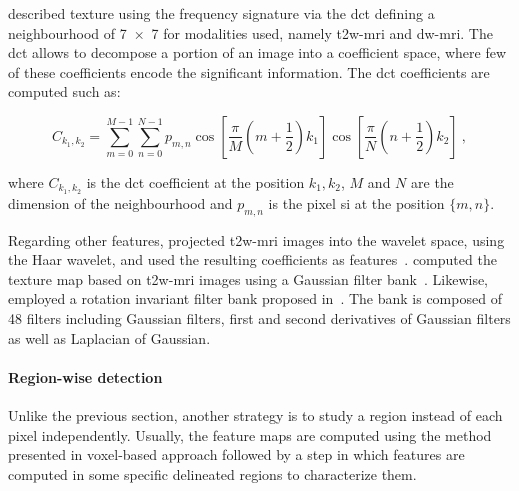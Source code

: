 \citeauthor{Chan2003} described texture using the frequency signature via the \acf{dct}\cite{Ahmed1974} defining a neighbourhood of \SI[product-units=repeat]{7x7}{\px} for modalities used, namely \ac{t2w}-\ac{mri} and \ac{dw}-\ac{mri}.
The \ac{dct} allows to decompose a portion of an image into a coefficient space, where few of these coefficients encode the significant information.
The \ac{dct} coefficients are computed such as:

\begin{equation}
	C_{k_1,k_2} = \sum_{m=0}^{M-1} \sum_{n=0}^{N-1} p_{m,n} \cos \left[ \frac{\pi}{M} \left( m + \frac{1}{2} \right) k_1 \right] \cos \left[ \frac{\pi}{N} \left( n + \frac{1}{2} \right) k_2 \right] \ ,
\end{equation}

\noindent where $C_{k_1,k_2}$ is the \ac{dct} coefficient at the position $k_1,k_2$, $M$ and $N$ are the dimension of the neighbourhood and $p_{m,n}$ is the pixel \ac{si} at the position $\{m,n\}$.

Regarding other features, \citeauthor{Viswanath2012} projected \ac{t2w}-\ac{mri} images into the wavelet space, using the Haar wavelet, and used the resulting coefficients as features~\cite{Viswanath2012}.
\citeauthor{Litjens2011} computed the texture map based on \ac{t2w}-\ac{mri} images using a Gaussian filter bank~\cite{Litjens2011}.
Likewise, \citeauthor{rampun2016computer} employed a rotation invariant filter bank proposed in~\cite{leung2001representing}.
The bank is composed of 48 filters including Gaussian filters, first and second derivatives of Gaussian filters as well as Laplacian of Gaussian.


\paragraph{Region-wise detection}

Unlike the previous section, another strategy is to study a region instead of each pixel independently.
Usually, the feature maps are computed using the method presented in voxel-based approach followed by a step in which features are computed in some specific delineated regions to characterize them.

